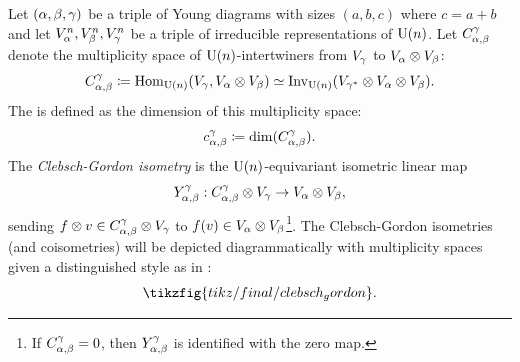 \documentclass[notitlepage, 10pt]{article}
\begin{document}
\begin{defn}
    \label{defn:lr_coeffs}
    Let $(\alpha, \beta, \gamma)$ be a triple of Young diagrams with sizes $(a,b,c)$ where $c=a+b$ and let $V_{\alpha}^n,V_{\beta}^n,V_{\gamma}^n$ be a triple of irreducible representations of $\operatorname{U}(n)$.
    Let $C_{\alpha, \beta}^{\gamma}$ denote the multiplicity space of $\operatorname{U}(n)$-intertwiners from $V_{\gamma}$ to $V_{\alpha} \otimes V_{\beta}$:
    \begin{equation}
        C_{\alpha, \beta}^{\gamma} \coloneqq \operatorname{Hom}_{\operatorname{U}(n)}(V_{\gamma}, V_{\alpha}\otimes V_{\beta}) \simeq \operatorname{Inv}_{\operatorname{U}(n)}(V_{\gamma^*} \otimes V_{\alpha} \otimes V_{\beta}).
    \end{equation}
    The  is defined as the dimension of this multiplicity space:
    \begin{equation}
        c_{\alpha,\beta}^{\gamma} \coloneqq \dim(C_{\alpha, \beta}^{\gamma}).
    \end{equation}
    The \textit{Clebsch-Gordon isometry} is the $\operatorname{U}(n)$-equivariant isometric linear map
    \begin{equation}
        Y_{\alpha,\beta}^{\gamma} : C_{\alpha,\beta}^{\gamma} \otimes V_{\gamma} \to V_{\alpha} \otimes V_{\beta},
    \end{equation}
    sending $f \otimes v \in C_{\alpha,\beta}^{\gamma} \otimes V_{\gamma}$ to $f(v) \in V_{\alpha}\otimes V_{\beta}$\footnote{If $C_{\alpha,\beta}^{\gamma} = 0$, then $Y_{\alpha,\beta}^{\gamma}$ is identified with the zero map.}.
    The Clebsch-Gordon isometries (and coisometries) will be depicted diagrammatically with multiplicity spaces given a distinguished style as in \cite{agrawala1968graphical}:
    \begin{equation}
        \tikzfig{tikz/final/clebsch_gordon}.
    \end{equation}
\end{defn}
\end{document}
